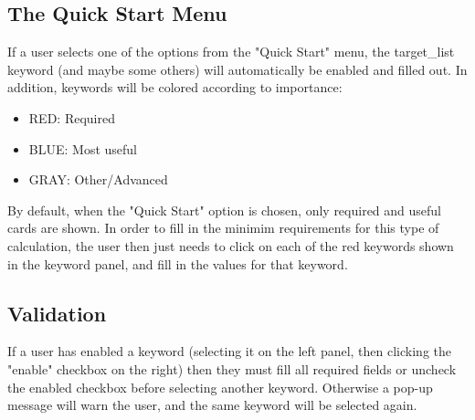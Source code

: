 \subsection{The Quick Start Menu}
If a user selects one of the options from the "Quick Start" menu, the 
target\_list keyword (and maybe some others) will automatically be enabled and filled out.
In addition, keywords will be colored according to importance:
\begin{itemize} 
\item RED: Required
\item BLUE: Most useful
\item GRAY: Other/Advanced
\end{itemize}
By default, when the "Quick Start" option is chosen, only required and useful cards are shown.
In order to fill in the minimim requirements for this type of calculation, the user then just 
needs to click on each of the red keywords shown in the keyword panel, and fill in the values
for that keyword. 

\subsection{Validation}
If a user has enabled a keyword (selecting it on the left panel, then clicking the "enable" checkbox on the right)
then they must fill all required fields or uncheck the enabled checkbox before selecting another keyword. Otherwise
a pop-up message will warn the user, and the same keyword will be selected again.
